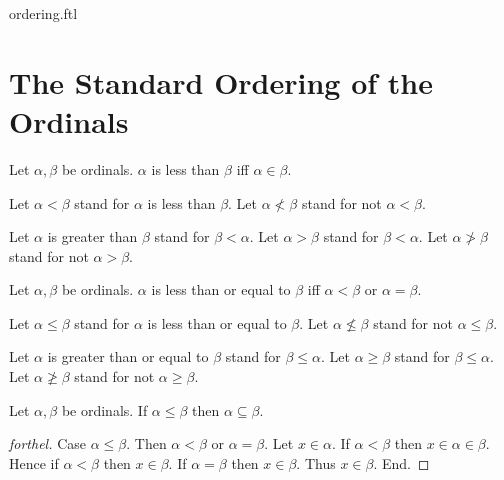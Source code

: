 \documentclass{naproche-library}
\begin{document}
\begin{smodule}{ordering.ftl}

  \section*{The Standard Ordering of the Ordinals}

  \begin{definition}[forthel,id=SET_THEORY_02_6654252130762752,printid]
    Let $\alpha, \beta$ be ordinals.
    $\alpha$ is less than $\beta$ iff $\alpha \in \beta$.

    Let $\alpha < \beta$ stand for $\alpha$ is less than $\beta$.
    Let $\alpha \nless \beta$ stand for not $\alpha < \beta$.

    Let $\alpha$ is greater than $\beta$ stand for $\beta < \alpha$.
    Let $\alpha > \beta$ stand for $\beta < \alpha$.
    Let $\alpha \ngtr \beta$ stand for not $\alpha > \beta$.
  \end{definition}

  \begin{definition}[forthel,id=SET_THEORY_02_2639956210089984,printid]
    Let $\alpha, \beta$ be ordinals.
    $\alpha$ is less than or equal to $\beta$ iff $\alpha < \beta$ or $\alpha = \beta$.

    Let $\alpha \leq \beta$ stand for $\alpha$ is less than or equal to $\beta$.
    Let $\alpha \nleq \beta$ stand for not $\alpha \leq \beta$.

    Let $\alpha$ is greater than or equal to $\beta$ stand for $\beta \leq \alpha$.
    Let $\alpha \geq \beta$ stand for $\beta \leq \alpha$.
    Let $\alpha \ngeq \beta$ stand for not $\alpha \geq \beta$.
  \end{definition}

  \begin{proposition}[forthel,id=SET_THEORY_02_3089369577553920,printid]
    Let $\alpha, \beta$ be ordinals.
    If $\alpha \leq \beta$ then $\alpha \subseteq \beta$.
  \end{proposition}
  \begin{proof}[forthel]
    Case $\alpha \leq \beta$.
      Then $\alpha < \beta$ or $\alpha = \beta$.
      Let $x \in \alpha$.
      If $\alpha < \beta$ then $x \in \alpha \in \beta$.
      Hence if $\alpha < \beta$ then $x \in \beta$.
      If $\alpha = \beta$ then $x \in \beta$.
      Thus $x \in \beta$.
    End.
  \end{proof}


\end{smodule}
\end{document}
